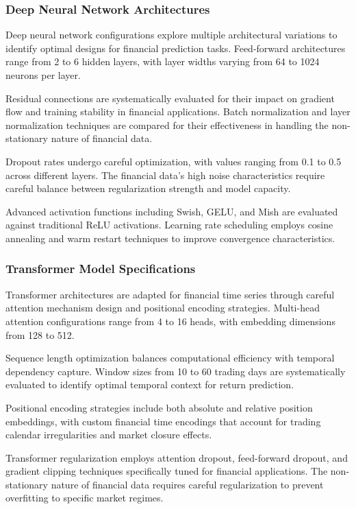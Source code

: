 \documentclass[conference]{IEEEtran}
\begin{document}
\subsubsection{Deep Neural Network Architectures}

Deep neural network configurations explore multiple architectural variations to identify optimal designs for financial prediction tasks. Feed-forward architectures range from 2 to 6 hidden layers, with layer widths varying from 64 to 1024 neurons per layer.

Residual connections are systematically evaluated for their impact on gradient flow and training stability in financial applications. Batch normalization and layer normalization techniques are compared for their effectiveness in handling the non-stationary nature of financial data.

Dropout rates undergo careful optimization, with values ranging from 0.1 to 0.5 across different layers. The financial data's high noise characteristics require careful balance between regularization strength and model capacity.

Advanced activation functions including Swish, GELU, and Mish are evaluated against traditional ReLU activations. Learning rate scheduling employs cosine annealing and warm restart techniques to improve convergence characteristics.

\subsubsection{Transformer Model Specifications}

Transformer architectures are adapted for financial time series through careful attention mechanism design and positional encoding strategies. Multi-head attention configurations range from 4 to 16 heads, with embedding dimensions from 128 to 512.

Sequence length optimization balances computational efficiency with temporal dependency capture. Window sizes from 10 to 60 trading days are systematically evaluated to identify optimal temporal context for return prediction.

Positional encoding strategies include both absolute and relative position embeddings, with custom financial time encodings that account for trading calendar irregularities and market closure effects.

Transformer regularization employs attention dropout, feed-forward dropout, and gradient clipping techniques specifically tuned for financial applications. The non-stationary nature of financial data requires careful regularization to prevent overfitting to specific market regimes.
\end{document}
